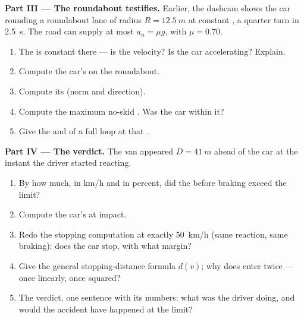 \begin{problem}
\medskip
\noindent\textbf{Part III --- The roundabout testifies.}
Earlier, the dashcam shows the car rounding a roundabout lane of
radius $R = \qty{12.5}{m}$ at constant , a quarter turn in
\qty{2.5}{s}. The road can supply at most $a_n = \mu g$, with
$\mu = 0.70$.
\begin{enumerate}[resume]
  \item The  is constant there --- is the velocity? Is the car
        accelerating? Explain.
  \item Compute the car's  on the roundabout.
  \item Compute its  (norm and direction).
  \item Compute the maximum no-skid . Was the car within it?
  \item Give the  and  of a full loop at that .
\end{enumerate}

\medskip
\noindent\textbf{Part IV --- The verdict.}
The van appeared $D = \qty{41}{m}$ ahead of the car at the instant
the driver started reacting.
\begin{enumerate}[resume]
  \item By how much, in \unit{km/h} and in percent, did the 
        before braking exceed the limit?
  \item Compute the car's  at impact.
  \item Redo the stopping computation at exactly \qty{50}{km/h} (same
        reaction, same braking): does the car stop, with what margin?
  \item Give the general stopping-distance formula $d(v)$; why does
         enter twice --- once linearly, once squared?
  \item The verdict, one sentence with its numbers: what  was the
        driver doing, and would the accident have happened at the limit?
\end{enumerate}
\end{problem}

